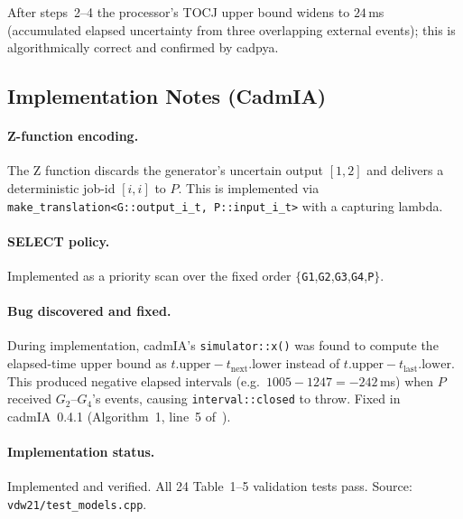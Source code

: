 After steps~2--4 the processor's TOCJ upper bound widens to $24$\,ms
(accumulated elapsed uncertainty from three overlapping external events);
this is algorithmically correct and confirmed by cadpya.

\subsection*{Implementation Notes (CadmIA)}

\paragraph{Z-function encoding.}
The Z function discards the generator's uncertain output $[1,2]$ and delivers
a deterministic job-id $[i,i]$ to $P$.  This is implemented via
\texttt{make\_translation<G::output\_i\_t, P::input\_i\_t>} with a capturing
lambda.

\paragraph{SELECT policy.}
Implemented as a priority scan over the fixed order
$\{$\texttt{G1},\texttt{G2},\texttt{G3},\texttt{G4},\texttt{P}$\}$.

\paragraph{Bug discovered and fixed.}
During implementation, cadmIA's \texttt{simulator::x()} was found to compute
the elapsed-time upper bound as $t.\mathrm{upper} - t_{\mathrm{next}}.\mathrm{lower}$
instead of $t.\mathrm{upper} - t_{\mathrm{last}}.\mathrm{lower}$.  This produced
negative elapsed intervals (e.g.\ $1005 - 1247 = {-242}$\,ms) when $P$ received
$G_2$--$G_4$'s events, causing \texttt{interval::closed} to throw.
Fixed in cadmIA~0.4.1 (Algorithm~1, line~5 of~\cite{VDW21}).

\paragraph{Implementation status.}
Implemented and verified.  All 24 Table~1--5 validation tests pass.
Source: \texttt{vdw21/test\_models.cpp}.
